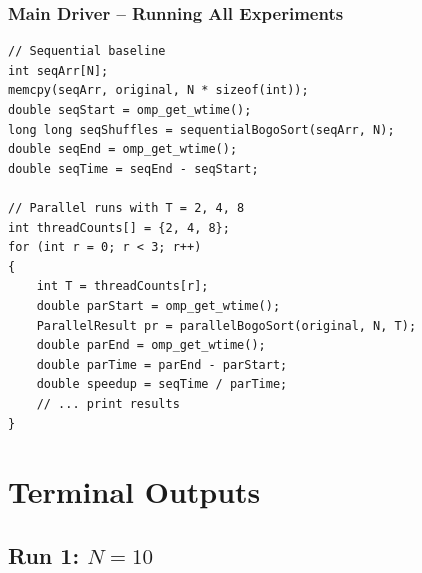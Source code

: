 \documentclass[11pt]{article}
\begin{document}
\subsubsection{Main Driver -- Running All Experiments}
\begin{codebox}
\begin{lstlisting}
// Sequential baseline
int seqArr[N];
memcpy(seqArr, original, N * sizeof(int));
double seqStart = omp_get_wtime();
long long seqShuffles = sequentialBogoSort(seqArr, N);
double seqEnd = omp_get_wtime();
double seqTime = seqEnd - seqStart;

// Parallel runs with T = 2, 4, 8
int threadCounts[] = {2, 4, 8};
for (int r = 0; r < 3; r++)
{
    int T = threadCounts[r];
    double parStart = omp_get_wtime();
    ParallelResult pr = parallelBogoSort(original, N, T);
    double parEnd = omp_get_wtime();
    double parTime = parEnd - parStart;
    double speedup = seqTime / parTime;
    // ... print results
}
\end{lstlisting}
\end{codebox}

\newpage

\section{Terminal Outputs}

\subsection{Run 1: $N = 10$}
\end{document}
